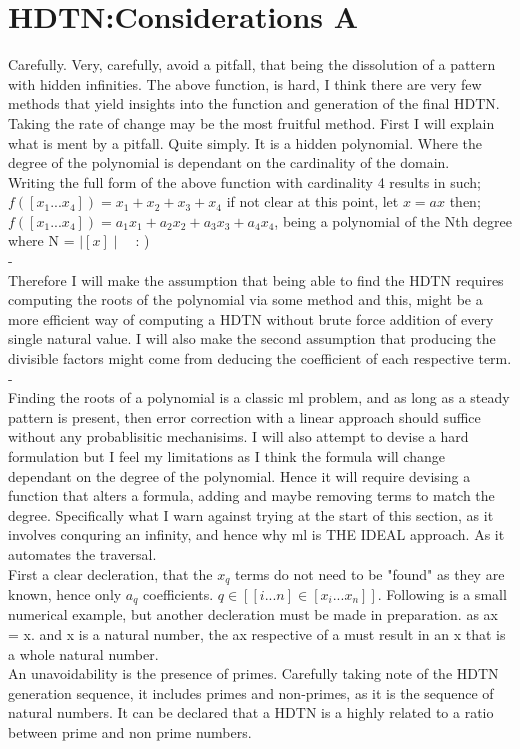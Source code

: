 \documentclass{article}
\begin{document}
\section{HDTN:Considerations A}
Carefully. Very, carefully, avoid a pitfall, that being the dissolution of a pattern with hidden infinities.
The above function, is hard, I think there are very few methods that yield insights into the function and generation
of the final HDTN. Taking the rate of change may be the most fruitful method. First I will explain what is ment by a pitfall.
Quite simply. It is a hidden polynomial. Where the degree of the polynomial is dependant on the cardinality of the domain.\\
Writing the full form of the above function with cardinality 4 results in such;\\
$f([x_1...x_4])=x_1+x_2+x_3+x_4$ if not clear at this point, let $x = ax$ then;\\
$f([x_1...x_4])=a_1x_1+a_2x_2+a_3x_3+a_4x_4$, being a polynomial of the Nth degree where N = $\mid[x]\mid$\ \ : )\\
{\color{white}-}\\
Therefore I will make the assumption that being able to find the HDTN requires computing the roots of the polynomial via some method
and this, might be a more efficient way of computing a HDTN without brute force addition of every single natural value. I will also
make the second assumption that producing the divisible factors might come from deducing the coefficient of each respective term.\\
{\color{white}-}\\
Finding the roots of a polynomial is a classic ml problem, and as long as a steady pattern is present, then error correction with
a linear approach should suffice without any probablisitic mechanisims. I will also attempt to devise a hard formulation but I feel
my limitations as I think the formula will change dependant on the degree of the polynomial. Hence it will require devising a
function that alters a formula, adding and maybe removing terms to match the degree. Specifically what I warn against trying at the 
start of this section, as it involves conquring an infinity, and hence why ml is THE IDEAL approach. As it automates the traversal.
\\
First a clear decleration, that the $x_q$ terms do not need to be "found" as they are known, hence only $a_q$ coefficients.
$q \in [[i...n]\in[x_i...x_n]]$. Following is a small numerical example, but another decleration must be made in preparation. as ax = x.
and x is a natural number, the ax respective of a must result in an x that is a whole natural number.\\
An unavoidability is the presence of primes. Carefully taking note of the HDTN generation sequence, it includes primes and non-primes,
as it is the sequence of natural numbers. It can be declared that a HDTN is a highly related to a ratio between prime and non prime numbers.
\end{document}
